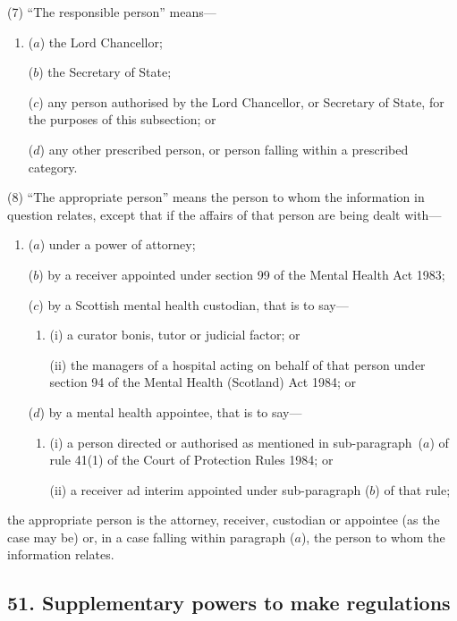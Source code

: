\documentclass[12pt,a4paper]{article}
\begin{document}
(7) “The responsible person” means—
\begin{enumerate}\item[]
($a$) the Lord Chancellor;

($b$) the Secretary of State;

($c$) any person authorised by the Lord Chancellor, or Secretary of State, for the purposes of this subsection; or

($d$) any other prescribed person, or person falling within a prescribed category.
\end{enumerate}

(8) “The appropriate person” means the person to whom the information in question relates, except that if the affairs of that person are being dealt with—
\begin{enumerate}\item[]
($a$) under a power of attorney;

($b$) by a receiver appointed under section 99 of the Mental Health Act 1983;

($c$) by a Scottish mental health custodian, that is to say—
\begin{enumerate}\item[]
(i) a curator bonis, tutor or judicial factor; or

(ii) the managers of a hospital acting on behalf of that person under section 94 of the Mental Health (Scotland) Act 1984; or
\end{enumerate}

($d$) by a mental health appointee, that is to say—
\begin{enumerate}\item[]
(i) a person directed or authorised as mentioned in sub-\hspace{0pt}paragraph~($a$)  of rule 41(1)  of the Court of Protection Rules 1984; or

(ii) a receiver ad interim appointed under sub-paragraph ($b$)  of that rule;
\end{enumerate}
\end{enumerate}
the appropriate person is the attorney, receiver, custodian or appointee (as the case may be) or, in a case falling within paragraph ($a$), the person to whom the information relates.


\subsection{51. Supplementary powers to make regulations}
\end{document}
